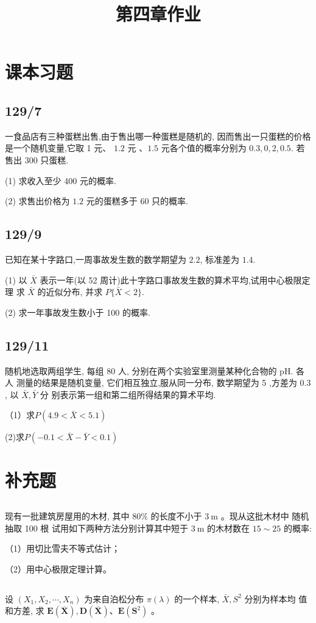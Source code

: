 \documentclass[UTF8,a4paper,10pt]{ctexart}
\title{第四章作业}
\begin{document}
\section{课本习题}
\subsection{129/7}
一食品店有三种蛋糕出售,由于售出哪一种蛋糕是随机的, 因而售出一只蛋糕的价格是一个随机变量,它取 1 元、 $1.2$ 元 $、 1.5$ 元各个值的概率分别为 $0.3,0,2,0.5$. 若售出 300 只蛋糕.


(1) 求收入至少 400 元的概率.


(2) 求售出价格为 $1.2$ 元的蛋糕多于 60 只的概率.


\subsection{129/9}
 已知在某十字路口,一周事故发生数的数学期望为 $2.2$, 标准差为 $1.4$.
 
 
(1) 以 $\bar{X}$ 表示一年(以 52 周计)此十字路口事故发生数的算术平均,试用中心极限定理 求 $\bar{X}$ 的近似分布, 并求 $P\{\bar{X}<2\}$.


(2) 求一年事故发生数小于 100 的概率.

\subsection{129/11}
 随机地选取两组学生, 每组 80 人, 分别在两个实验室里测量某种化合物的 $\mathrm{pH}$. 各人 测量的结果是随机变量, 它们相互独立,服从同一分布, 数学期望为 5 ,方差为 $0.3$, 以 $\bar{X}, \bar{Y}$ 分 别表示第一组和第二组所得结果的算术平均.
 
 
（1）求$P(4.9<\bar{X}<5.1)$


(2)求$P(-0.1<\bar{X}-\bar{Y}<0.1)$

\section{补充题}
\subsection{}
现有一批建筑房屋用的木材, 其中 $80 \%$ 的长度不小于 $3 \mathrm{~m}$ 。现从这批木材中 随机抽取 100 根 试用如下两种方法分别计算其中短于 $3 \mathrm{~m}$ 的木材数在 $15 \sim 25$ 的概率:

（1）用切比雪夫不等式估计；


（2）用中心极限定理计算。

\subsection{}
设 $\left(X_{1}, X_{2}, \cdots, X_{n}\right)$ 为来自泊松分布 $\pi(\lambda)$ 的一个样本, $\bar{X}, S^{2}$ 分别为样本均 值和方差, 求 $\boldsymbol{E}(\overline{\boldsymbol{X}}), \boldsymbol{D}(\overline{\boldsymbol{X}}) 、 \boldsymbol{E}\left(\boldsymbol{S}^{2}\right)$ 。
\end{document}
